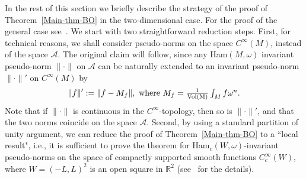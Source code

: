 \documentclass{icmart}
\theoremstyle{definition}
\begin{document}
In the rest of this section we briefly describe the strategy of the proof of
Theorem~\ref{Main-thm-BO} in the two-dimensional case. For the proof of the general case see~\cite{BO}. 
We start with two straightforward reduction steps. 
First, for technical reasons, 
%
%
%
we shall consider 
pseudo-norms on the space
$C^{\infty}(M)$,  instead of the space ${\mathcal A}$.
The original claim will follow, %
since any
Ham$(M,\omega)$ invariant pseudo-norm $\| \cdot \|$ on ${\mathcal
A}$ can be naturally extended to an invariant pseudo-norm $\| \cdot
\|'$ on $C^{\infty}(M)$ by %
$$\| f \|' := \| f- M_f \|, \ {\rm where \ } M_f = {\textstyle {\frac 1 {\rm Vol(M)}} \int_M f \omega^n}.$$ Note that if
$\| \cdot \|$ is continuous in the $C^{\infty}$-topology, then so is
$\| \cdot \|'$, and that the two norms coincide 
on the space ${\mathcal A}$. Second, by using a standard
partition of unity argument, we can reduce the proof of Theorem~\ref{Main-thm-BO}
to a ``local result", i.e., %
it is sufficient to prove the
theorem for Ham$_c(W,\omega)$-invariant pseudo-norms
on the space of compactly supported smooth functions $C_c^{\infty}(W)$, where $W=(-L,L)^{2}$ is an open %
square in ${\mathbb R}^{2}$ (see~\cite{BO} for the details).

\smallskip
\end{document}
